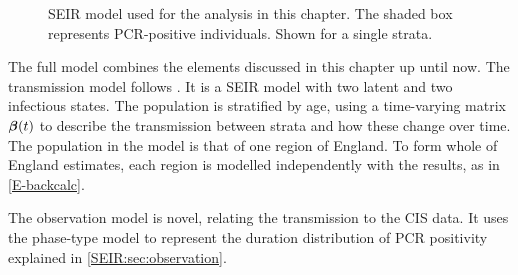 \documentclass[thesis.tex]{subfiles}
\begin{document}
\begin{figure}
  \caption[SEIR model]{SEIR model used for the analysis in this chapter. The shaded box represents PCR-positive individuals. Shown for a single strata.}
  \label{SEIR:fig:full-model}
\end{figure}

The full model combines the elements discussed in this chapter up until now.
The transmission model follows \textcite{birrellRealtime}.
It is a SEIR model with two latent and two infectious states.
The population is stratified by age, using a time-varying matrix $\bm{\beta}(t)$ to describe the transmission between strata and how these change over time.
The population in the model is that of one region of England.
To form whole of England estimates, each region is modelled independently with the results, as in \cref{E-backcalc}.

The observation model is novel, relating the transmission to the CIS data.
It uses the phase-type model to represent the duration distribution of PCR positivity explained in \cref{SEIR:sec:observation}.
\end{document}
